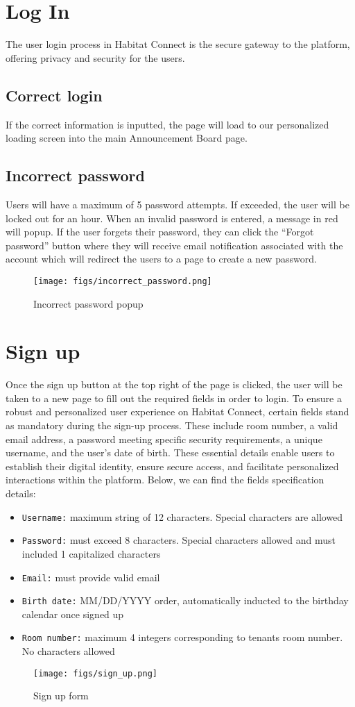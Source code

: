 \documentclass[conference]{IEEEtran}
\begin{document}
\section*{Log In}
The user login process in Habitat Connect is the secure gateway to the platform, offering privacy and security for the users.
\subsection*{Correct login}
If the correct information is inputted, the page will load to our personalized loading screen into the main Announcement Board page.
\subsection*{Incorrect password}
Users will have a maximum of 5 password attempts. If exceeded, the user will be locked out for an hour. When an invalid password is entered, a message in red will popup. If the user forgets their password, they can click the “Forgot password” button where they will receive email notification associated with the account which will redirect the users to a page to create a new password.
    \begin{figure}[H]
    \centering
    \texttt{[image: figs/incorrect\_password.png]}
    \caption{Incorrect password popup}
    \label{fig:Incorrect password popup}
    \end{figure}
\section*{Sign up}
Once the sign up  button at the top right of the page is clicked, the user will be taken to a new page to fill out the required fields in order to login. To ensure a robust and personalized user experience on Habitat Connect, certain fields stand as mandatory during the sign-up process. These include room number, a valid email address, a password meeting specific security requirements, a unique username, and the user's date of birth. These essential details enable users to establish their digital identity, ensure secure access, and facilitate personalized interactions within the platform. Below, we can find the fields specification details:
\begin{itemize}
    \item \texttt{Username:} maximum string of 12 characters. Special characters are allowed
    \item \texttt{Password:} must exceed 8 characters. Special characters allowed and must included 1 capitalized characters
    \item \texttt{Email:} must provide valid email
    \item \texttt{Birth date:} MM/DD/YYYY order, automatically inducted to the birthday calendar once signed up
    \item \texttt{Room number:} maximum 4 integers corresponding to tenants room number. No characters allowed
\end{itemize}
    \begin{figure}[H]
    \centering
    \texttt{[image: figs/sign\_up.png]}
    \caption{Sign up form}
    \label{fig:Sign up form}
    \end{figure}
\end{document}
